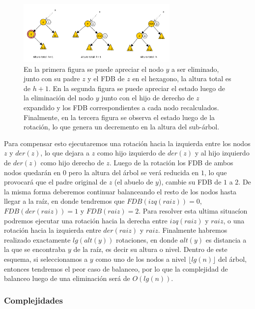\begin{figure}
 \centering
 \includegraphics[width=0.70\textwidth]{graficos/PeorCasoEliminacionAVL.pdf}
 \caption*{\newline \footnotesize En la primera figura se puede apreciar el nodo $y$ a ser eliminado, junto con su padre $z$ y el FDB de $z$ en el hexagono, la altura total es de $h+1$. En la segunda figura se puede apreciar el estado luego de la eliminaci\'on del nodo $y$ junto con el hijo de derecho de $z$ expandido y los FDB correspondientes a cada nodo recalculados. Finalmente, en la tercera figura se observa el estado luego de la rotaci\'on, lo que genera un decremento en la altura del sub-\'arbol.}
\end{figure}

Para compensar esto ejecutaremos una rotaci\'on hacia la izquierda entre los nodos $z$ y $der(z)$, lo que dejara a $z$ como hijo izquierdo de $der(z)$ y al hijo izquierdo de $der(z)$ como hijo derecho de $z$. Luego de la rotaci\'on los FDB de ambos nodos quedar\'an en $0$ pero la altura del \'arbol se ver\'a reducida en $1$, lo que provocar\'a que el padre original de $z$ (el abuelo de $y$), cambie su FDB de $1$ a $2$. De la misma forma deberemos continuar balanceando el resto de los nodos hasta llegar a la ra\'iz, en donde tendremos que $FDB(izq(raiz)) = 0$, $FDB(der(raiz)) = 1$ y $FDB(raiz) = 2$. Para resolver esta ultima situac\'ion podremos ejecutar una rotaci\'on hacia la derecha entre $izq(raiz)$ y $raiz$, o una rotaci\'on hacia la izquierda entre $der(raiz)$ y $raiz$. Finalmente habremos realizado exactamente $lg(alt(y))$ rotaciones, en donde $alt(y)$ es distancia a la que se encontraba $y$ de la ra\'iz, es decir su altura o nivel. Dentro de este esquema, si seleccionamos a $y$ como uno de los nodos a 
nivel $\lfloor lg(n) \rfloor$ del \'arbol, entonces tendremos el peor caso de balanceo, por lo que la complejidad de balanceo luego de una eliminaci\'on ser\'a de $O(lg(n))$.

\subsubsection{Complejidades}

